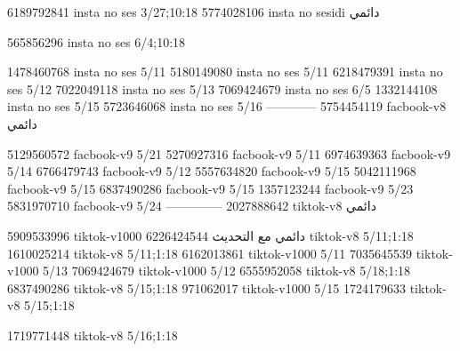 
6189792841 insta no ses
3/27;10:18
5774028106 insta no sesidi
دائمي


565856296 insta no ses
6/4;10:18


1478460768 insta no ses
5/11
5180149080 insta no ses
5/11
6218479391 insta no ses
5/12
7022049118 insta no ses
5/13
7069424679 insta no ses
6/5
1332144108 insta no ses
5/15
5723646068 insta no ses
5/16
------------
5754454119 facbook-v8
دائمي

5129560572 facbook-v9
5/21
5270927316 facbook-v9
5/11
6974639363 facbook-v9
5/14
6766479743 facbook-v9
5/12
5557634820 facbook-v9
5/15
5042111968 facbook-v9
5/15
6837490286 facbook-v9
5/15
1357123244 facbook-v9
5/23
5831970710 facbook-v9
5/24
--------------
2027888642 tiktok-v8
دائمي

5909533996 tiktok-v1000
دائمي مع التحديث
6226424544 tiktok-v8
5/11;1:18
1610025214 tiktok-v8
5/11;1:18
6162013861 tiktok-v1000
5/11
7035645539 tiktok-v1000
5/13
7069424679 tiktok-v1000
5/12
6555952058 tiktok-v8
5/18;1:18
6837490286 tiktok-v8
5/15;1:18
971062017 tiktok-v1000
5/15
1724179633 tiktok-v8
5/15;1:18

1719771448 tiktok-v8
5/16;1:18
